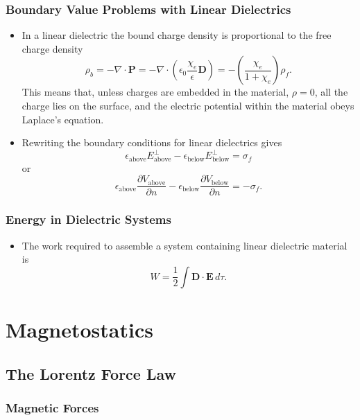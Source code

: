 \documentclass{article}
\renewcommand{\vec}[1]{\boldsymbol{\mathbf{#1}}}
\begin{document}
\subsubsection{Boundary Value Problems with Linear Dielectrics}

\begin{itemize}
  \item In a linear dielectric the bound charge density is proportional to the free charge density \[\rho_b = -\nabla \cdot \vec{P} = -\nabla \cdot \left( \epsilon_0 \frac{\chi_e}{\epsilon} \vec{D} \right) = -\left( \frac{\chi_e}{1 + \chi_e} \right) \rho_f.\] This means that, unless charges are embedded in the material, $\rho = 0$, all the charge lies on the surface, and the electric potential within the material obeys Laplace's equation.

  \item Rewriting the boundary conditions for linear dielectrics gives \[\epsilon_\text{above} E_\text{above}^\perp - \epsilon_\text{below} E_\text{below}^\perp = \sigma_f\] or \[\epsilon_\text{above} \frac{\partial V_\text{above}}{\partial n} - \epsilon_\text{below} \frac{\partial V_\text{below}}{\partial n} = -\sigma_f.\]
\end{itemize}

\subsubsection{Energy in Dielectric Systems}

\begin{itemize}
  \item The work required to assemble a system containing linear dielectric material is \[W = \frac{1}{2} \int \vec{D} \cdot \vec{E} \,d \tau.\]
\end{itemize}

\section{Magnetostatics}

\subsection{The Lorentz Force Law}

\setcounter{subsubsection}{1}
\subsubsection{Magnetic Forces}
\end{document}
